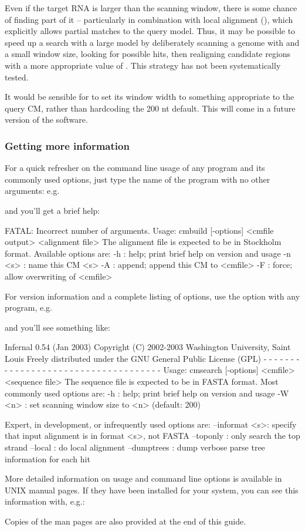 Even if the target RNA is larger than the scanning window, there is
some chance of finding part of it -- particularly in combination with
local alignment (), which explicitly allows partial
matches to the query model. Thus, it may be possible to speed up a
search with a large model by deliberately scanning a genome with
 and a small window size, looking for possible hits,
then realigning candidate regions with a more appropriate value of
. This strategy has not been systematically tested.

It would be sensible for  to set its window width to
something appropriate to the query CM, rather than hardcoding the 200
nt default. This will come in a future version of the software.


\subsubsection{Getting more information}

For a quick refresher on the command line usage of any program and its
commonly used options, just type the name of the program with no other
arguments: e.g.\


and you'll get a brief help:

\begin{sreoutput}
FATAL: Incorrect number of arguments.
Usage: cmbuild [-options] <cmfile output> <alignment file>
The alignment file is expected to be in Stockholm format.
  Available options are:
   -h     : help; print brief help on version and usage
   -n <s> : name this CM <s>
   -A     : append; append this CM to <cmfile>
   -F     : force; allow overwriting of <cmfile>
\end{sreoutput}

For version information and a complete listing of options, use the
 option with any program, e.g.\


and you'll see something like:

\begin{sreoutput}
Infernal 0.54 (Jan 2003)
Copyright (C) 2002-2003 Washington University, Saint Louis
Freely distributed under the GNU General Public License (GPL)
- - - - - - - - - - - - - - - - - - - - - - - - - - - - - - - - - - - -
Usage: cmsearch [-options] <cmfile> <sequence file>
The sequence file is expected to be in FASTA format.
  Most commonly used options are:
   -h     : help; print brief help on version and usage
   -W <n> : set scanning window size to <n> (default: 200)

  Expert, in development, or infrequently used options are:
   --informat <s>: specify that input alignment is in format <s>, not FASTA
   --toponly     : only search the top strand
   --local       : do local alignment
   --dumptrees   : dump verbose parse tree information for each hit
\end{sreoutput}

More detailed information on usage and command line options is
available in UNIX manual pages. If they have been installed for your
system, you can see this information with, e.g.:


Copies of the man pages are also provided at the end of this guide.






